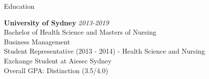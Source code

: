 \documentclass{resume} %
\begin{document}

\begin{rSection}{Education}

{\bf University of Sydney} \hfill {\em 2013-2019} \\ 
Bachelor of Health Science and Masters of Nursing \\
Business Management \smallskip \\
Student Representative (2013 - 2014) - Health Science and Nursing  \\
Exchange Student at Aiesec Sydney \\
Overall GPA: Distinction (3.5/4.0)

\end{rSection}

\end{document}
